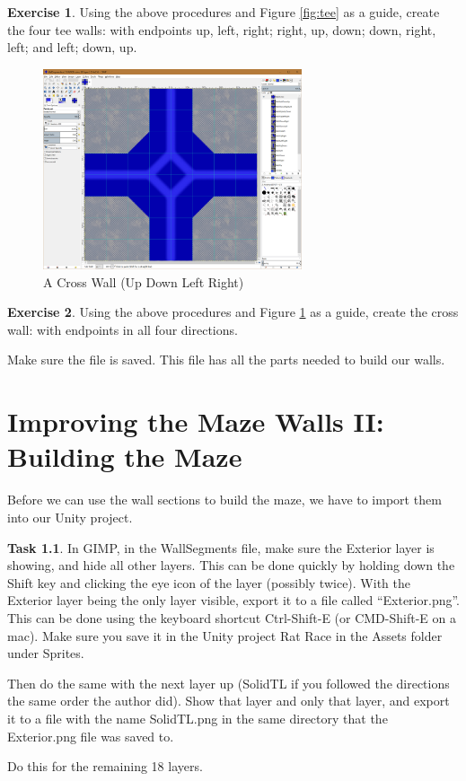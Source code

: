 \documentclass[12pt]{amsbook}
\theoremstyle{definition}
\newtheorem{exercise}{Exercise}[chapter]
\newtheorem{task}[exercise]{Task}
\theoremstyle{remark}
\numberwithin{figure}{chapter}
\numberwithin{table}{chapter}
\numberwithin{section}{chapter}
\numberwithin{equation}{section}
\begin{document}
\begin{exercise}
Using the above procedures and Figure \ref{fig:tee} as a guide, create the four tee walls: with endpoints up, left, right; right, up, down; down, right, left; and left; down, up.  
\end{exercise}


\begin{figure}[h]
  \includegraphics[width=3in]{Cross.png}
  \caption{A Cross Wall (Up Down Left Right)}
  \label{fig:cross}
\end{figure}

\begin{exercise}
Using the above procedures and Figure \ref{fig:cross} as a guide, create the cross wall: with endpoints in all four directions.
\end{exercise}

Make sure the file is saved.  This file has all the parts needed to build our walls.

\chapter[Improving Maze Walls II]{Improving the Maze Walls II: Building the Maze}

Before we can use the wall sections to build the maze, we have to import them into our Unity project.

\begin{task}
In GIMP, in the WallSegments file, make sure the Exterior layer is showing, and hide all other layers.  This can be done quickly by holding down the Shift key and clicking the eye icon of the layer (possibly twice).  With the Exterior layer being the only layer visible, export it to a file called ``Exterior.png''.  This can be done using the keyboard shortcut Ctrl-Shift-E (or CMD-Shift-E on a mac).  Make sure you save it in the Unity project Rat Race in the Assets folder under Sprites.  

Then do the same with the next layer up (SolidTL if you followed the directions the same order the author did).  Show that layer and only that layer, and export it to a file with the name SolidTL.png in the same directory that the Exterior.png file was saved to.

Do this for the remaining 18 layers.
\end{task}
\end{document}
